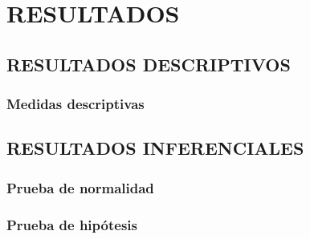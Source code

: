 \chapter{RESULTADOS}
\section{RESULTADOS DESCRIPTIVOS}

\lipsum[1]

\subsection{Medidas descriptivas}

\lipsum[2]

\section{RESULTADOS INFERENCIALES}

\lipsum[3]

\subsection{Prueba de normalidad}

\lipsum[4]

\subsection{Prueba de hipótesis}

\lipsum[5]
